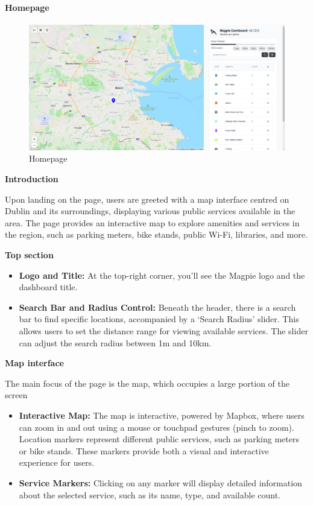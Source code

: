 \newpage{}

\paragraph{Homepage}\mbox{}

\begin{figure}[h]
    \centering{}
    \includegraphics[width=1\textwidth]{images/site/home/homepage_1.png}
    \caption{Homepage}
\end{figure}




\textbf{Introduction}

Upon landing on the page, users are greeted with a map interface centred on Dublin and its surroundings, displaying various public services available in the area. The page provides an interactive map to explore amenities and services in the region, such as parking meters, bike stands, public Wi{-}Fi, libraries, and more.

\textbf{Top section}

\begin{itemize}
    \item{} \textbf{Logo and Title:} At the top{-}right corner, you’ll see the Magpie logo and the dashboard title.
    \item{} \textbf{Search Bar and Radius Control:} Beneath the header, there is a search bar to find specific locations, accompanied by a `Search Radius' slider. This allows users to set the distance range for viewing available services. The slider can adjust the search radius between 1m and 10km.
\end{itemize}

\textbf{Map interface}

The main focus of the page is the map, which occupies a large portion of the screen

\begin{itemize}
    \item{} \textbf{Interactive Map:} The map is interactive, powered by Mapbox, where users can zoom in and out using a mouse or touchpad gestures (pinch to zoom). Location markers represent different public services, such as parking meters or bike stands. These markers provide both a visual and interactive experience for users.
    \item{} \textbf{Service Markers:} Clicking on any marker will display detailed information about the selected service, such as its name, type, and available count.
\end{itemize}

